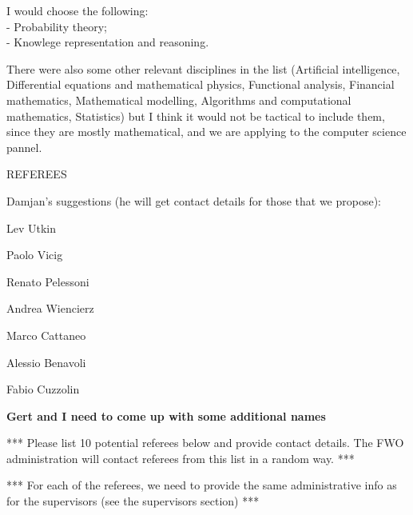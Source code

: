 \documentclass[11pt,dvipsnames,usenames,a4paper]{article}
\begin{document}
I would choose the following:\\[5pt]
- Probability theory;\\
- Knowlege representation and reasoning.

There were also some other relevant disciplines in the list (Artificial intelligence, Differential equations and mathematical physics, Functional analysis, Financial mathematics, Mathematical modelling, Algorithms and computational mathematics, Statistics) but I think it would not be tactical to include them, since they are mostly mathematical, and we are applying to the computer science pannel.


\vspace{5mm}

\begin{shaded}\centering REFEREES \end{shaded}

Damjan's suggestions (he will get contact details for those that we propose):

Lev Utkin

Paolo Vicig

Renato Pelessoni

Andrea Wiencierz

Marco Cattaneo

Alessio Benavoli

Fabio Cuzzolin


{\bf\color{blue} Gert and I need to come up with some additional names}


*** Please list 10 potential referees below and provide contact details.
The FWO administration will contact referees from this list in a random way. ***

*** For each of the referees, we need to provide the same administrative info as for the supervisors (see the supervisors section) ***
\end{document}
